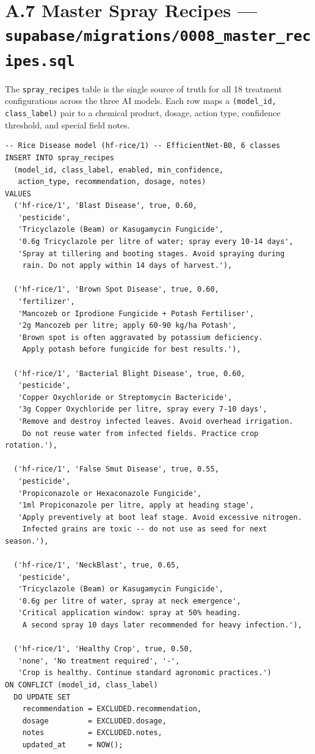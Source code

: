 \documentclass[12pt,a4paper]{report}
\begin{document}
\newpage

\section*{A.7 \quad Master Spray Recipes --- \texttt{supabase/migrations/0008\_master\_recipes.sql}}

The \texttt{spray\_recipes} table is the single source of truth for all 18 treatment configurations across the three AI models. Each row maps a \texttt{(model\_id, class\_label)} pair to a chemical product, dosage, action type, confidence threshold, and special field notes.

\begin{lstlisting}[style=sql, caption={Spray recipes for Rice Disease model --- 6 classes (0008\_master\_recipes.sql, excerpt)}]
-- Rice Disease model (hf-rice/1) -- EfficientNet-B0, 6 classes
INSERT INTO spray_recipes
  (model_id, class_label, enabled, min_confidence,
   action_type, recommendation, dosage, notes)
VALUES
  ('hf-rice/1', 'Blast Disease', true, 0.60,
   'pesticide',
   'Tricyclazole (Beam) or Kasugamycin Fungicide',
   '0.6g Tricyclazole per litre of water; spray every 10-14 days',
   'Spray at tillering and booting stages. Avoid spraying during
    rain. Do not apply within 14 days of harvest.'),

  ('hf-rice/1', 'Brown Spot Disease', true, 0.60,
   'fertilizer',
   'Mancozeb or Iprodione Fungicide + Potash Fertiliser',
   '2g Mancozeb per litre; apply 60-90 kg/ha Potash',
   'Brown spot is often aggravated by potassium deficiency.
    Apply potash before fungicide for best results.'),

  ('hf-rice/1', 'Bacterial Blight Disease', true, 0.60,
   'pesticide',
   'Copper Oxychloride or Streptomycin Bactericide',
   '3g Copper Oxychloride per litre, spray every 7-10 days',
   'Remove and destroy infected leaves. Avoid overhead irrigation.
    Do not reuse water from infected fields. Practice crop rotation.'),

  ('hf-rice/1', 'False Smut Disease', true, 0.55,
   'pesticide',
   'Propiconazole or Hexaconazole Fungicide',
   '1ml Propiconazole per litre, apply at heading stage',
   'Apply preventively at boot leaf stage. Avoid excessive nitrogen.
    Infected grains are toxic -- do not use as seed for next season.'),

  ('hf-rice/1', 'NeckBlast', true, 0.65,
   'pesticide',
   'Tricyclazole (Beam) or Kasugamycin Fungicide',
   '0.6g per litre of water, spray at neck emergence',
   'Critical application window: spray at 50% heading.
    A second spray 10 days later recommended for heavy infection.'),

  ('hf-rice/1', 'Healthy Crop', true, 0.50,
   'none', 'No treatment required', '-',
   'Crop is healthy. Continue standard agronomic practices.')
ON CONFLICT (model_id, class_label)
  DO UPDATE SET
    recommendation = EXCLUDED.recommendation,
    dosage         = EXCLUDED.dosage,
    notes          = EXCLUDED.notes,
    updated_at     = NOW();
\end{lstlisting}
\end{document}
